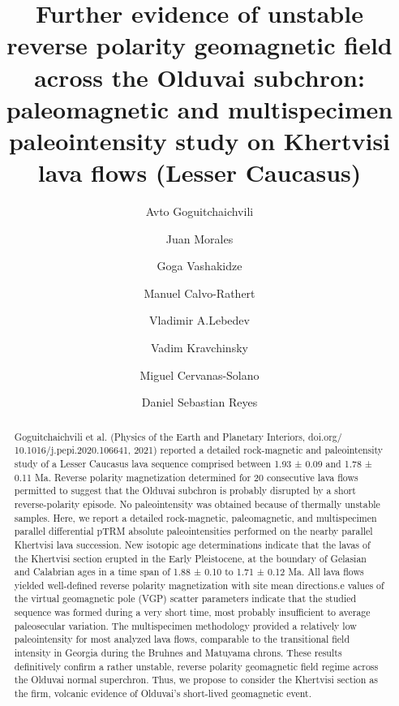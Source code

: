 \documentclass[review]{elsarticle}
\begin{document}
\begin{frontmatter}

\title{Further evidence of unstable reverse polarity geomagnetic field across the
Olduvai subchron: paleomagnetic and multispecimen paleointensity study
on Khertvisi lava flows (Lesser Caucasus)}

\author[a]{Avto Goguitchaichvili}
\author[a]{Juan Morales}
\author[b]{Goga Vashakidze}
\author[c]{Manuel Calvo-Rathert}
\author[d]{Vladimir A.Lebedev}
\author[e]{Vadim Kravchinsky}
\author[a]{Miguel Cervanas-Solano}
\author[a]{Daniel Sebastian Reyes}

\address[a]{Laboratorio Interinstitucional de Magnetismo Natural, Instituto de Geofísica, UNAM – Campus Morelia, M\'{e}xico}
\address[b]{I. Javakhishvili Tbilisi State University, Tbilisi, Georgia}
\address[c]{Departamento de Física, EPS Campus Rio Vena – Universidad de Burgos, 09006 Burgos, Spain}
\address[d]{Institute of Geology of Ore Deposits, Petrography, Mineralogy and Geochemistry, Russian Academy of Sciences (IGEM RAS), Moscow, Russia}
\address[e]{Geophysics, Department of Physics, University of Alberta, Edmonton, Alberta T6G2E1, Canada}

\ead{}

\begin{abstract}
Goguitchaichvili et al. (Physics of the Earth and Planetary Interiors, doi.org/ 10.1016/j.pepi.2020.106641, 2021) reported a detailed rock-magnetic and paleointensity study of a Lesser Caucasus lava sequence comprised between 1.93 ± 0.09 and 1.78 ± 0.11 Ma. Reverse polarity magnetization determined for 20 consecutive lava flows permitted to suggest that the Olduvai subchron is probably disrupted by a short reverse-polarity episode. No paleointensity was obtained because of thermally unstable samples. Here, we report a detailed rock-magnetic, paleomagnetic, and multispecimen parallel differential pTRM absolute paleointensities performed on the nearby parallel Khertvisi lava succession. New isotopic age determinations indicate that the lavas of the Khertvisi section erupted in the Early Pleistocene, at the boundary of Gelasian and Calabrian ages in a time span of 1.88 ± 0.10 to 1.71 ± 0.12 Ma. All lava flows yielded well-defined reverse polarity magnetization with site mean directions.e values of the virtual geomagnetic pole (VGP) scatter parameters indicate that the studied sequence was formed during a very short time, most probably insufficient to average paleosecular variation. The multispecimen methodology provided a relatively low paleointensity for most analyzed lava flows, comparable to the transitional field intensity in Georgia during the Bruhnes and Matuyama chrons. These results definitively confirm a rather unstable, reverse polarity geomagnetic field regime across the Olduvai normal superchron. Thus, we propose to consider the Khertvisi section as the firm, volcanic evidence of Olduvai’s short-lived geomagnetic event.
\end{abstract}


\end{frontmatter}
\end{document}
